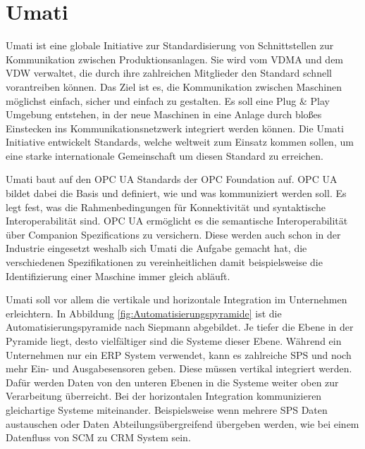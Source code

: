 \documentclass[a4paper, 12pt, oneside, toc=listofnumbered, bibliography=totoc]{scrbook}
\begin{document}
		
	
	\section{\ac{Umati}}
		
		\ac{Umati} ist eine globale Initiative zur Standardisierung von Schnittstellen zur Kommunikation zwischen Produktionsanlagen. Sie wird vom \ac{VDMA} und dem \ac{VDW} verwaltet, die durch ihre zahlreichen Mitglieder den Standard schnell vorantreiben können. Das Ziel ist es, die Kommunikation zwischen Maschinen möglichst einfach, sicher und einfach zu gestalten. Es soll eine Plug \& Play Umgebung entstehen, in der neue Maschinen in eine Anlage durch bloßes Einstecken ins Kommunikationsnetzwerk integriert werden können. Die \ac{Umati} Initiative entwickelt Standards, welche weltweit zum Einsatz kommen sollen, um eine starke internationale Gemeinschaft um diesen Standard zu erreichen. \cite{noauthor_umati_2023}
		
		\ac{Umati} baut auf den OPC UA Standards der OPC Foundation auf. OPC UA bildet dabei die Basis und definiert, wie und was kommuniziert werden soll. Es legt fest, was die Rahmenbedingungen für Konnektivität und syntaktische Interoperabilität sind. \cite{noauthor_umati_2023} OPC UA ermöglicht es die semantische Interoperabilität über Companion Spezifications zu versichern. Diese werden auch schon in der Industrie eingesetzt weshalb sich \ac{Umati} die Aufgabe gemacht hat, die verschiedenen Spezifikationen zu vereinheitlichen damit beispielsweise die Identifizierung einer Maschine immer gleich abläuft.
		
		\ac{Umati} soll vor allem die vertikale und horizontale Integration im Unternehmen erleichtern. In Abbildung \ref{fig:Automatisierungspyramide} ist die Automatisierungspyramide nach Siepmann abgebildet. Je tiefer die Ebene in der Pyramide liegt, desto vielfältiger sind die Systeme dieser Ebene. Während ein Unternehmen nur ein \ac{ERP} System verwendet, kann es zahlreiche SPS und noch mehr Ein- und Ausgabesensoren geben. Diese müssen vertikal integriert werden. Dafür werden Daten von den unteren Ebenen in die Systeme weiter oben zur Verarbeitung überreicht. Bei der horizontalen Integration kommunizieren gleichartige Systeme miteinander. Beispielsweise wenn mehrere SPS Daten austauschen oder Daten Abteilungsübergreifend übergeben werden, wie bei einem Datenfluss von SCM zu CRM System sein. 
		
\end{document}
